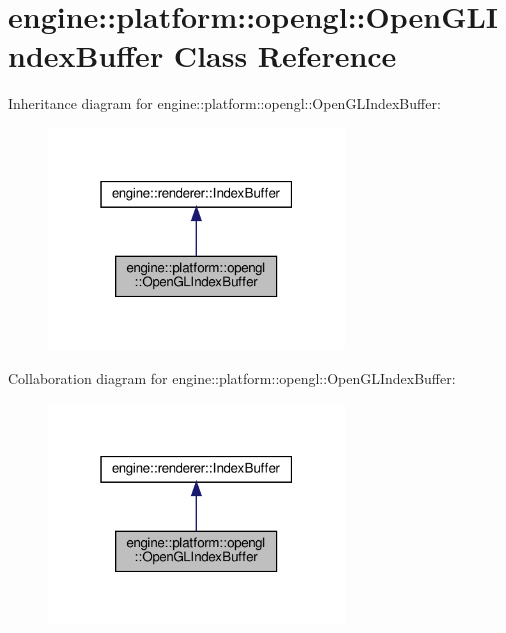 \hypertarget{classengine_1_1platform_1_1opengl_1_1OpenGLIndexBuffer}{}\section{engine\+:\+:platform\+:\+:opengl\+:\+:Open\+G\+L\+Index\+Buffer Class Reference}
\label{classengine_1_1platform_1_1opengl_1_1OpenGLIndexBuffer}


Inheritance diagram for engine\+:\+:platform\+:\+:opengl\+:\+:Open\+G\+L\+Index\+Buffer\+:
\nopagebreak
\begin{figure}[H]
\begin{center}
\leavevmode
\includegraphics[width=223pt]{classengine_1_1platform_1_1opengl_1_1OpenGLIndexBuffer__inherit__graph}
\end{center}
\end{figure}


Collaboration diagram for engine\+:\+:platform\+:\+:opengl\+:\+:Open\+G\+L\+Index\+Buffer\+:
\nopagebreak
\begin{figure}[H]
\begin{center}
\leavevmode
\includegraphics[width=223pt]{classengine_1_1platform_1_1opengl_1_1OpenGLIndexBuffer__coll__graph}
\end{center}
\end{figure}
